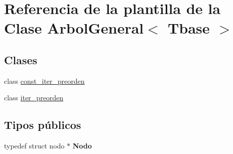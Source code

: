 \hypertarget{class_arbol_general}{}\section{Referencia de la plantilla de la Clase Arbol\+General$<$ Tbase $>$}
\label{class_arbol_general}
\subsection*{Clases}
\begin{DoxyCompactItemize}
\item 
class \hyperlink{class_arbol_general_1_1const__iter__preorden}{const\+\_\+iter\+\_\+preorden}
\item 
class \hyperlink{class_arbol_general_1_1iter__preorden}{iter\+\_\+preorden}
\end{DoxyCompactItemize}
\subsection*{Tipos públicos}
\begin{DoxyCompactItemize}
\item 
typedef struct nodo $\ast$ {\bfseries Nodo}\hypertarget{class_arbol_general_a12cc1b74a9095d89bc7334290d332f7a}{}\label{class_arbol_general_a12cc1b74a9095d89bc7334290d332f7a}

\end{DoxyCompactItemize}
